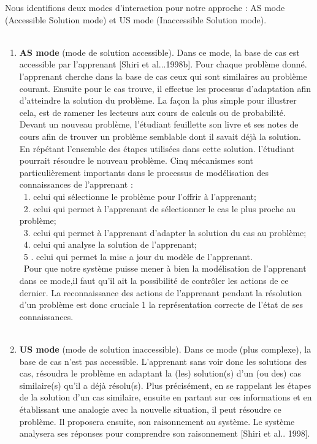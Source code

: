 Nous identifions deux modes d'interaction pour notre approche :
AS mode (Accessible Solution mode) et US mode (Inaccessible Solution mode). \\\
\begin{enumerate}
\item \textbf{AS mode} (mode de solution accessible). Dans ce mode, la base de cas est accessible par l'apprenant [Shiri et al...1998b]. Pour chaque problème donné. l'apprenant cherche dans la base de cas ceux qui sont similaires au problème courant. Ensuite pour le cas trouve, il effectue les processus d'adaptation afin d'atteindre la solution du problème.
La façon la plus simple pour illustrer cela, est de ramener les lecteurs aux cours de calculs ou de probabilité. Devant un nouveau problème, l'étudiant feuillette son livre et ses notes de cours afin de trouver un problème semblable dont il savait déjà la  solution. En répétant l'ensemble des étapes utilisées dans cette solution. l'étudiant pourrait résoudre le nouveau problème.
Cinq mécanismes sont particulièrement importants dans le processus de modélisation
des connaissances de l'apprenant :\\\
    1. celui qui sélectionne le problème pour l'offrir à l'apprenant;\\\
    2. celui qui permet à l'apprenant de sélectionner le cas le plus proche au problème;\\\
    3. celui qui permet à l'apprenant d'adapter la solution du cas au problème;\\\
    4. celui qui analyse la solution de l'apprenant;\\\
    5 . celui qui permet la mise a jour du modèle de l'apprenant.\\\
Pour que notre système puisse mener à bien la modélisation de l'apprenant dans ce mode,il faut qu'il ait la possibilité de contrôler les actions de ce dernier. La reconnaissance des actions de l'apprenant pendant la résolution d'un problème est donc cruciale 1 la représentation correcte de l'état de ses connaissances. \\\
\item \textbf{US mode} (mode de solution inaccessible). Dans ce mode (plus complexe), la base de cas n'est pas accessible. L'apprenant sans voir donc les solutions des cas, résoudra le problème en adaptant la (les) solution(s) d'un (ou des) cas similaire(s) qu'il a déjà résolu(s). Plus précisément, en se rappelant les étapes de la solution d'un cas similaire, ensuite en partant sur ces informations et en établissant une analogie avec la nouvelle situation, il peut résoudre ce problème. Il proposera ensuite, son raisonnement au système. Le système analysera ses réponses pour comprendre son raisonnement [Shiri et al.. 1998].
\end{enumerate}
\\\

